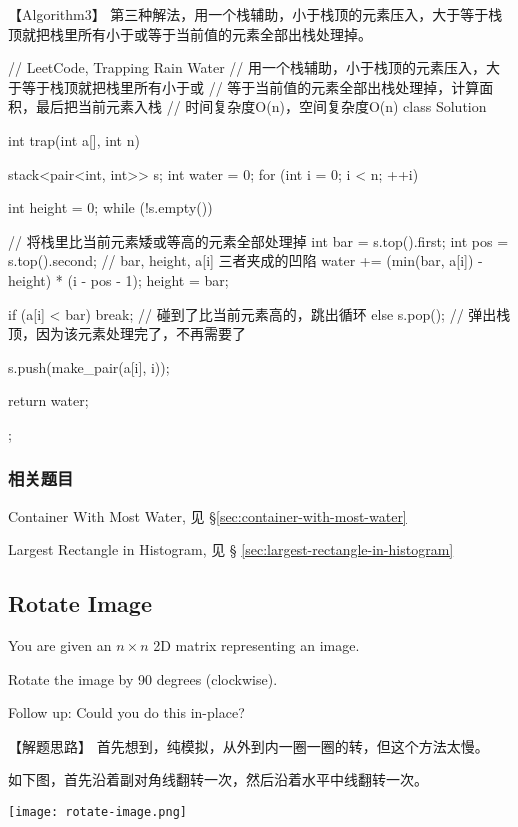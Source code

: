 【Algorithm3】
第三种解法，用一个栈辅助，小于栈顶的元素压入，大于等于栈顶就把栈里所有小于或等于当前值的元素全部出栈处理掉。
\begin{Code}
	// LeetCode, Trapping Rain Water
	// 用一个栈辅助，小于栈顶的元素压入，大于等于栈顶就把栈里所有小于或
	// 等于当前值的元素全部出栈处理掉，计算面积，最后把当前元素入栈
	// 时间复杂度O(n)，空间复杂度O(n)
	class Solution {
		int trap(int a[], int n) {
			stack<pair<int, int>> s;
			int water = 0;
			for (int i = 0; i < n; ++i) {
				int height = 0;
				while (!s.empty()) { // 将栈里比当前元素矮或等高的元素全部处理掉
					int bar = s.top().first;
					int pos = s.top().second;
					// bar, height, a[i] 三者夹成的凹陷
					water += (min(bar, a[i]) - height) * (i - pos - 1);
					height = bar;
					
					if (a[i] < bar) break; // 碰到了比当前元素高的，跳出循环
					else s.pop(); // 弹出栈顶，因为该元素处理完了，不再需要了
				}
				s.push(make_pair(a[i], i));
			}
			return water;
		}
	};
\end{Code}


\subsubsection{相关题目}
\begindot
\item Container With Most Water, 见 \S \ref{sec:container-with-most-water}
\item Largest Rectangle in Histogram, 见 \S
\ref{sec:largest-rectangle-in-histogram}
\myenddot


\subsection{Rotate Image} %
\label{sec:rotate-image}



You are given an $n \times n$ 2D matrix representing an image.

Rotate the image by 90 degrees (clockwise).

Follow up:
Could you do this in-place?


【解题思路】
首先想到，纯模拟，从外到内一圈一圈的转，但这个方法太慢。

如下图，首先沿着副对角线翻转一次，然后沿着水平中线翻转一次。

\begin{center}
	\texttt{[image: rotate-image.png]}\\
	\label{fig:rotate-image}
\end{center}

